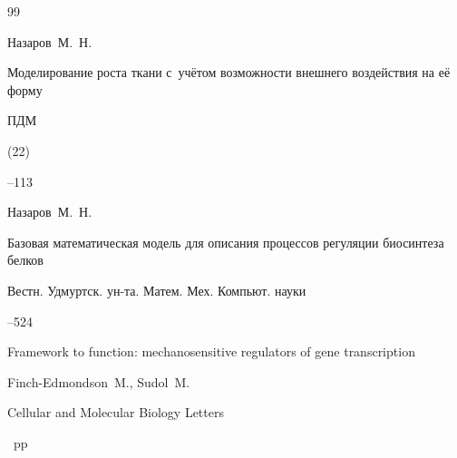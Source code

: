 \begin{thebibliography}{99}

 


\by    Назаров~М.~Н.

\paper Моделирование роста ткани с~учётом возможности внешнего воздействия на её форму

\jour ПДМ


(22)

--113





\by    Назаров~М.~Н.

\paper Базовая математическая модель для описания процессов регуляции биосинтеза белков

\jour Вестн. Удмуртск. ун-та. Матем. Мех. Компьют. науки




--524








\paper  Framework to function: mechanosensitive regulators of gene transcription

\by     Finch-Edmondson~M., Sudol~M.

\jour   Cellular and Molecular Biology Letters




~pp \nofrills


 

\end{thebibliography}

 





